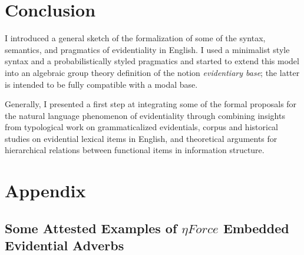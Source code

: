 \documentclass[11pt]{article}
\begin{document}




\section{Conclusion}
I introduced a general sketch of the formalization of some of the
syntax, semantics, and pragmatics of evidentiality in English. I used a minimalist style syntax and a probabilistically styled pragmatics and started to extend this model into an algebraic group theory definition of the
notion \textsl{evidentiary base}; the latter is intended to be fully compatible with a modal base. 

Generally, I presented a first step at integrating some of the formal proposals for the natural language phenomenon of evidentiality through combining insights from typological work on grammaticalized evidentials, corpus and historical studies on evidential lexical items in English, and theoretical arguments for hierarchical relations between functional items in information structure. 

\section{Appendix}\label{appendix}

\subsection{Some Attested Examples of $\eta Force$ Embedded Evidential Adverbs}\label{subseceta}
\end{document}
